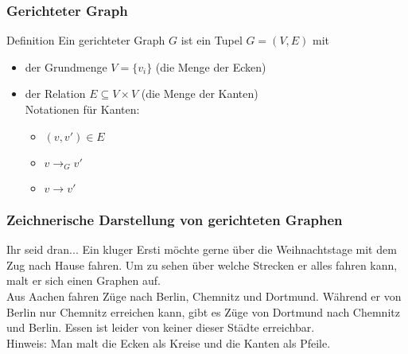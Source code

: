\begin{frame}
	\frametitle{Gerichteter Graph}
	\begin{block}{Definition}
	Ein gerichteter Graph $G$ ist ein Tupel $G=(V,E)$ mit
	\begin{itemize}
		\item der Grundmenge $V = \{v_i\}$ (die Menge der Ecken)
		\item der Relation $E\subseteq V\times V$ (die Menge der Kanten) \\ Notationen für Kanten:
		\begin{itemize}
			\item $(v,v')\in E$
			\item $v\rightarrow_G v'$
			\item $v \to v'$
		\end{itemize}
	\end{itemize}
	\end{block}
\end{frame}


\begin{frame}
	\frametitle{Zeichnerische Darstellung von gerichteten Graphen}

	\begin{block}{Ihr seid dran...}
		Ein kluger Ersti möchte gerne über die Weihnachtstage mit dem Zug nach Hause fahren. Um zu sehen über welche Strecken er alles fahren kann, malt er sich einen Graphen auf. \\ \pause
		Aus Aachen fahren Züge nach Berlin, Chemnitz und Dortmund. Während er von Berlin nur Chemnitz erreichen kann, gibt es Züge von Dortmund nach Chemnitz und Berlin. Essen ist leider von keiner dieser Städte erreichbar. \\
		Hinweis: Man malt die Ecken als Kreise und die Kanten als Pfeile.
	\end{block}
\end{frame}

